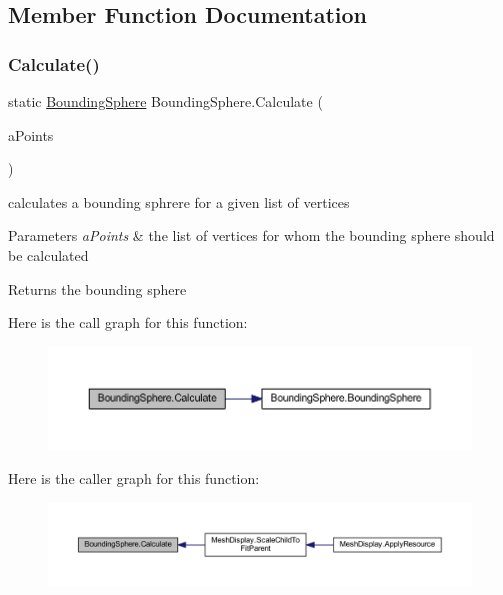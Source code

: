 \subsection{Member Function Documentation}
\mbox{\label{class_bounding_sphere_a29c277d13a701089666b94fabf3c87d6}} 
\subsubsection{\texorpdfstring{Calculate()}{Calculate()}}
{\footnotesize\ttfamily static \mbox{\hyperlink{class_bounding_sphere}{Bounding\+Sphere}} Bounding\+Sphere.\+Calculate (\begin{DoxyParamCaption}\item[{I\+Enumerable$<$ Vector3 $>$}]{a\+Points }\end{DoxyParamCaption})\hspace{0.3cm}{\ttfamily [static]}}



calculates a bounding sphrere for a given list of vertices 


\begin{DoxyParams}{Parameters}
{\em a\+Points} & the list of vertices for whom the bounding sphere should be calculated\\
\hline
\end{DoxyParams}
\begin{DoxyReturn}{Returns}
the bounding sphere
\end{DoxyReturn}
Here is the call graph for this function\+:
\nopagebreak
\begin{figure}[H]
\begin{center}
\leavevmode
\includegraphics[width=350pt]{class_bounding_sphere_a29c277d13a701089666b94fabf3c87d6_cgraph}
\end{center}
\end{figure}
Here is the caller graph for this function\+:
\nopagebreak
\begin{figure}[H]
\begin{center}
\leavevmode
\includegraphics[width=350pt]{class_bounding_sphere_a29c277d13a701089666b94fabf3c87d6_icgraph}
\end{center}
\end{figure}


